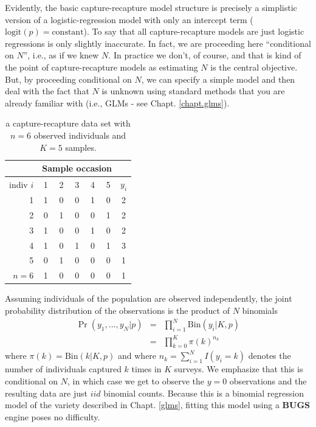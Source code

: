 Evidently, the basic
capture-recapture model structure is precisely a simplistic version of
a logistic-regression model with only an intercept term
($\mbox{logit}(p) = \mbox{constant}$).  To say that all
capture-recapture models are just logistic regressions is only
slightly inaccurate. In fact, we are proceeding here ``conditional on
$N$'', i.e., as if we knew $N$. In practice we don't, of course, and
that is kind of the point of capture-recapture models as estimating
$N$ is the central objective. But, by proceeding conditional on $N$,
we can specify a simple model and then deal with the fact that $N$ is
unknown using standard methods that you are already familiar with
(i.e., GLMs - see Chapt. \ref{chapt.glms}).
\begin{table}
\centering
\caption{a capture-recapture data set with $n=6$ observed individuals
and $K=5$ samples.}
\begin{tabular}{r|ccccc|c}
&  \multicolumn{5}{c}{Sample occasion} &  \\ \hline
 indiv $i$ &  1 & 2 & 3 & 4 & 5 & $y_{i}$ \\ \hline
  1 &     1 & 0 & 0 & 1 & 0  & 2   \\
  2 &     0 & 1 & 0 & 0 & 1  & 2   \\
  3 &     1 & 0 & 0 & 1 & 0  & 2   \\
  4 &     1 & 0 & 1 & 0 & 1  & 3   \\
  5 &     0 & 1 & 0 & 0 & 0  & 1   \\
  $n=6$ & 1 & 0 & 0 & 0 & 0  & 1   \\ \hline
\end{tabular}
\label{closed.tab.3.1}
\end{table}

Assuming individuals of the population are observed independently, the
joint probability distribution of the observations is the product of
$N$ binomials
\begin{eqnarray*}
  \Pr(y_1, \ldots, y_N | p) &=& \prod_{i=1}^N  \mathrm{Bin}(y_i | K, p) \\
   &=& \prod_{k=0}^K  \pi(k)^{n_k}
\end{eqnarray*}
where $\pi(k) = \mathrm{Bin}(k | K,p)$ and where $n_k = \sum_{i=1}^N
I(y_i = k)$ denotes the number of individuals captured $k$ times in
$K$ surveys. We emphasize that this is conditional on $N$, in which
case we get to observe the $y=0$ observations and the resulting data
are just $iid$ binomial counts. Because this is a binomial regression
model of the variety described in Chapt. \ref{glms}, fitting this model using
a {\bf BUGS} engine poses no difficulty.


